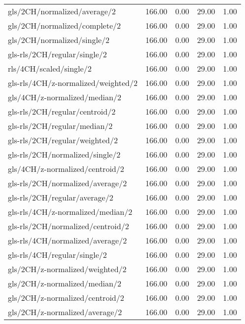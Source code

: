 \begin{longtable}{lrrrr}
    gls/2CH/normalized/average/2              & 166.00 &  0.00 & 29.00 &  1.00 \\
    gls/2CH/normalized/complete/2             & 166.00 &  0.00 & 29.00 &  1.00 \\
    gls/2CH/normalized/single/2               & 166.00 &  0.00 & 29.00 &  1.00 \\
    gls-rls/2CH/regular/single/2              & 166.00 &  0.00 & 29.00 &  1.00 \\
    rls/4CH/scaled/single/2                   & 166.00 &  0.00 & 29.00 &  1.00 \\
    gls-rls/4CH/z-normalized/weighted/2       & 166.00 &  0.00 & 29.00 &  1.00 \\
    gls/4CH/z-normalized/median/2             & 166.00 &  0.00 & 29.00 &  1.00 \\
    gls-rls/2CH/regular/centroid/2            & 166.00 &  0.00 & 29.00 &  1.00 \\
    gls-rls/2CH/regular/median/2              & 166.00 &  0.00 & 29.00 &  1.00 \\
    gls-rls/2CH/regular/weighted/2            & 166.00 &  0.00 & 29.00 &  1.00 \\
    gls-rls/2CH/normalized/single/2           & 166.00 &  0.00 & 29.00 &  1.00 \\
    gls/4CH/z-normalized/centroid/2           & 166.00 &  0.00 & 29.00 &  1.00 \\
    gls-rls/2CH/normalized/average/2          & 166.00 &  0.00 & 29.00 &  1.00 \\
    gls-rls/2CH/regular/average/2             & 166.00 &  0.00 & 29.00 &  1.00 \\
    gls-rls/4CH/z-normalized/median/2         & 166.00 &  0.00 & 29.00 &  1.00 \\
    gls-rls/2CH/normalized/centroid/2         & 166.00 &  0.00 & 29.00 &  1.00 \\
    gls-rls/4CH/normalized/average/2          & 166.00 &  0.00 & 29.00 &  1.00 \\
    gls-rls/4CH/regular/single/2              & 166.00 &  0.00 & 29.00 &  1.00 \\
    gls/2CH/z-normalized/weighted/2           & 166.00 &  0.00 & 29.00 &  1.00 \\
    gls/2CH/z-normalized/median/2             & 166.00 &  0.00 & 29.00 &  1.00 \\
    gls/2CH/z-normalized/centroid/2           & 166.00 &  0.00 & 29.00 &  1.00 \\
    gls/2CH/z-normalized/average/2            & 166.00 &  0.00 & 29.00 &  1.00 \\

\end{longtable}

